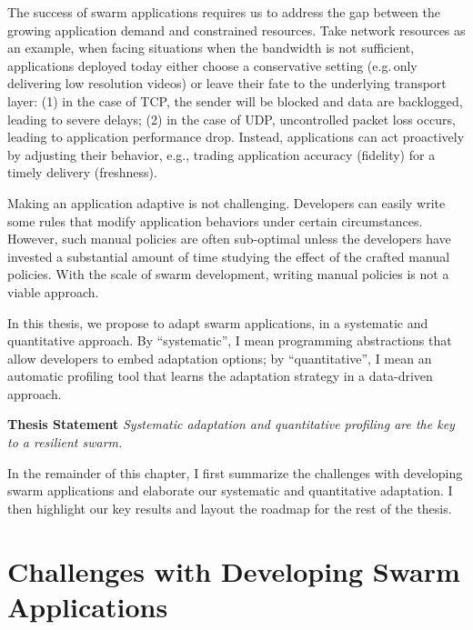 \documentclass[thesis.tex]{subfiles}
\begin{document}
The success of swarm applications requires us to address the gap between the
growing application demand and constrained resources. Take network resources as
an example, when facing situations when the bandwidth is not sufficient,
applications deployed today either choose a conservative setting (e.g.\,only
delivering low resolution videos) or leave their fate to the underlying
transport layer: (1) in the case of TCP, the sender will be blocked and data are
backlogged, leading to severe delays; (2) in the case of UDP, uncontrolled
packet loss occurs, leading to application performance drop. Instead,
applications can act proactively by adjusting their behavior, e.g., trading
application accuracy (fidelity) for a timely delivery (freshness).

Making an application adaptive is not challenging. Developers can easily write
some rules that modify application behaviors under certain
circumstances. However, such manual policies are often sub-optimal unless the
developers have invested a substantial amount of time studying the effect of the
crafted manual policies. With the scale of swarm development, writing manual
policies is not a viable approach.

In this thesis, we propose to adapt swarm applications, in a systematic and
quantitative approach. By ``systematic'', I mean programming abstractions that
allow developers to embed adaptation options; by ``quantitative'', I mean an
automatic profiling tool that learns the adaptation strategy in a data-driven
approach.

\vspace{1em}

\noindent\textbf{Thesis Statement} \newline
\textit{Systematic adaptation and quantitative profiling are the key to
  a resilient swarm.}

\vspace{1em}

In the remainder of this chapter, I first summarize the challenges with
developing swarm applications and elaborate our systematic and quantitative
adaptation. I then highlight our key results and layout the roadmap for the rest
of the thesis.

\section{Challenges with Developing Swarm Applications}
\label{sec:chall-with-exist}

\end{document}
